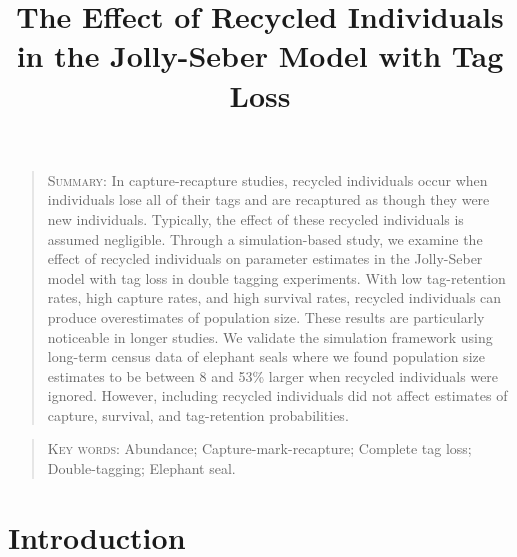 \documentclass[12pt]{article}
\title{The Effect of Recycled Individuals in the Jolly-Seber Model with Tag
Loss}
\date{}
\begin{document}
\maketitle


\begin{quote}
\textsc{Summary:} In capture-recapture studies, recycled individuals occur
when individuals lose all of their tags and are recaptured as though they were new
individuals. Typically, the effect of these recycled individuals is
assumed negligible. Through a simulation-based study, we examine the
effect of recycled individuals on parameter estimates in the
Jolly-Seber model with tag loss \citep{Cowen:2006} in double tagging experiments. With low tag-retention
rates, high capture rates, and high survival rates, recycled individuals
can produce overestimates of population size. These results are
particularly noticeable in longer studies. We validate the simulation
framework using long-term census data of elephant seals where we found population size estimates to be between 8 and 53\% larger when recycled individuals were ignored. However, including recycled individuals did not affect estimates of capture, survival, and tag-retention probabilities.
\end{quote}

\begin{quote}
\begin{center} \textsc{Key words:} Abundance; Capture-mark-recapture; Complete tag loss;  Double-tagging; Elephant seal. 
\end{center}
\end{quote}

\section{Introduction}\label{introduction}
\end{document}
